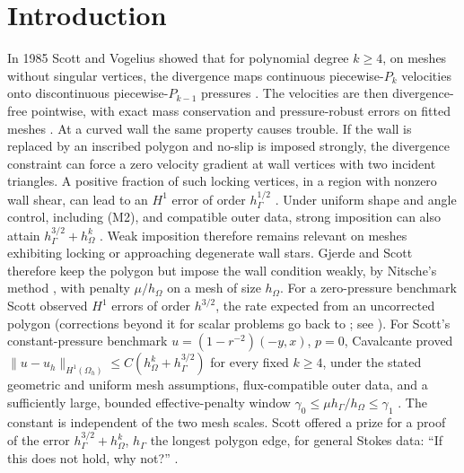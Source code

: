 \documentclass[5p,times]{elsarticle}
\theoremstyle{definition}
\newcommand{\hG}{h_\Gamma}
\newcommand{\hO}{h_\Omega}
\newcommand{\Oh}{\Omega_h}
\newcommand{\norm}[1]{\lVert #1\rVert}
\begin{document}
\section{Introduction}\label{sec:intro}

In 1985 Scott and Vogelius showed that for polynomial degree $k\ge4$, on meshes without singular vertices, the divergence maps continuous piecewise-$P_k$ velocities onto discontinuous piecewise-$P_{k-1}$ pressures \cite{ScottVogelius1985,GuzmanScott2019}. The velocities are then divergence-free pointwise, with exact mass conservation and pressure-robust errors on fitted meshes \cite{JohnEtAl2017}. At a curved wall the same property causes trouble. If the wall is replaced by an inscribed polygon and no-slip is imposed strongly, the divergence constraint can force a zero velocity gradient at wall vertices with two incident triangles. A positive fraction of such locking vertices, in a region with nonzero wall shear, can lead to an $H^1$ error of order $\hG^{1/2}$ \cite{ScottPrize,GjerdeScott2024}. Under uniform shape and angle control, including (M2), and compatible outer data, strong imposition can also attain $\hG^{3/2}+\hO^k$ \cite{PadhiExt}. Weak imposition therefore remains relevant on meshes exhibiting locking or approaching degenerate wall stars. Gjerde and Scott \cite{GjerdeScott2024} therefore keep the polygon but impose the wall condition weakly, by Nitsche's method \cite{Nitsche1971}, with penalty $\mu/\hO$ on a mesh of size $\hO$. For a zero-pressure benchmark Scott observed $H^1$ errors of order $h^{3/2}$, the rate expected from an uncorrected polygon (corrections beyond it for scalar problems go back to \cite{BrambleDupontThomee1972}; see \cite{DupontGuzmanScott2025}).
For Scott's constant-pressure benchmark $u=(1-r^{-2})(-y,x)$, $p=0$, Cavalcante proved $\norm{u-u_h}_{H^1(\Oh)}\le C(\hO^k+\hG^{3/2})$ for every fixed $k\ge4$, under the stated geometric and uniform mesh assumptions, flux-compatible outer data, and a sufficiently large, bounded effective-penalty window $\gamma_0\le\mu\hG/\hO\le\gamma_1$ \cite[Theorem~5.2]{Cavalcante2026}. The constant is independent of the two mesh scales.
 Scott offered a prize for a proof of the error $\hG^{3/2}+\hO^k$, $\hG$ the longest polygon edge, for general Stokes data: ``If this does not hold, why not?'' \cite{ScottPrize}.
\end{document}
